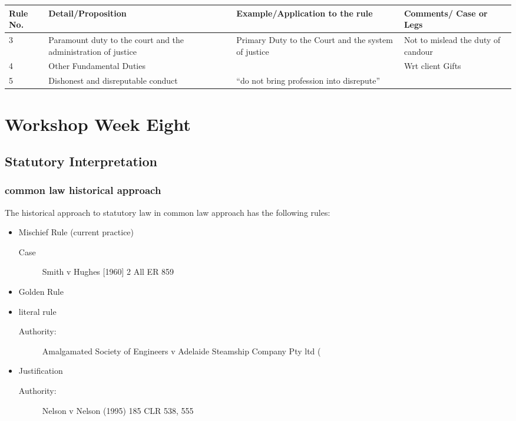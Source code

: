 \begin{minipage}{\textwidth}
\begin{tabular}{p{1cm}p{3cm}p{3cm}p{4cm}}
     Rule No. & Detail/Proposition & Example/Application to the rule & Comments/ Case or Legs  \\
     \hline
     3 & Paramount duty to the court and the administration of justice & Primary Duty to the Court and the system of justice & Not to mislead the duty of candour \\

     4 & Other Fundamental Duties & {} & Wrt client Gifts \\
     5 & Dishonest and disreputable conduct & ``do not bring profession into disrepute'' & {}\\
\end{tabular}
\end{minipage}

\section*{Workshop Week Eight}
\date{April 30th 2024}

\subsection*{Statutory Interpretation}

\subsubsection*{common law historical approach}
The historical approach to statutory law in common law approach has the following rules: 
\begin{itemize}
    \item Mischief Rule (current practice)
        \begin{description}
            \item[Case] Smith v Hughes [1960] 2 All ER 859
        \end{description}
    \item Golden Rule
    \item literal rule
        \begin{description}
            \item[Authority:] Amalgamated Society of Engineers v Adelaide Steamship Company Pty ltd (
        \end{description}
    \item Justification
        \begin{description}
            \item[Authority:] Nelson v Nelson (1995) 185 CLR 538, 555 
        \end{description}
\end{itemize}

